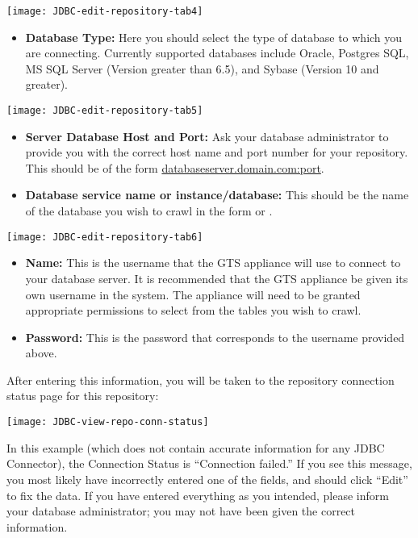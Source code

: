 \texttt{[image: JDBC-edit-repository-tab4]}

\begin{itemize}

\item \textbf{Database Type:} Here you should select the type of
database to which you are connecting. Currently supported databases
include Oracle, Postgres SQL, MS SQL Server (Version greater than
6.5), and Sybase (Version 10 and greater).

\end{itemize}

\texttt{[image: JDBC-edit-repository-tab5]}

\begin{itemize}

\item \textbf{Server Database Host and Port:} Ask your database
administrator to provide you with the correct host name and port
number for your repository. This should be of the form
\url{databaseserver.domain.com:port}.

\item \textbf{Database service name or instance/database:} This should
be the name of the database you wish to crawl in the form
 or \linebreak {}.

\end{itemize}

\texttt{[image: JDBC-edit-repository-tab6]}

\begin{itemize}

\item \textbf{Name:} This is the username that the GTS appliance will
use to connect to your database server. It is recommended that the GTS
appliance be given its own username in the system. The appliance will
need to be granted appropriate permissions to select from the tables
you wish to crawl.

\item \textbf{Password:} This is the password that corresponds to the
username provided above.

\end{itemize}


After entering this information, you will be taken to the repository 
connection status page for this repository:

\texttt{[image: JDBC-view-repo-conn-status]}

In this example (which does not contain accurate information for any
JDBC Connector), the Connection Status is ``Connection failed.''
If you see this message, you most likely have incorrectly entered one
of the fields, and should click ``Edit'' to fix the data. If you have
entered everything as you intended, please inform your database administrator;
you may not have been given the correct information.
